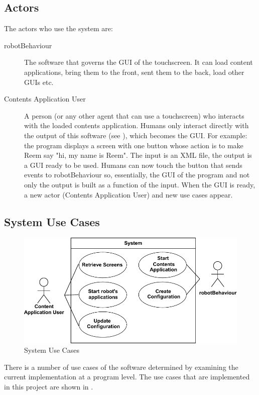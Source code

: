 \subsection*{Actors}
The actors who use the system are:
\begin{description}
	\item[robotBehaviour] The software that governs the \ac{GUI} of the touchscreen. It can load content applications, bring them to the front, sent them to the back, load other \acp{GUI} etc.
	\item[Contents Application User] A person (or any other agent that can use a touchscreen) who interacts with the loaded contents application. Humans only interact directly with the output of this software (see ), which becomes the \ac{GUI}.
For example: the program displays a screen with one button whose action is to make Reem say "hi, my name is Reem".
The input is an \ac{XML} file, the output is a \ac{GUI} ready to be used.
Humans can now touch the button that sends events to robotBehaviour so, essentially, the \ac{GUI} of the program and not only the output is built as a function of the input.
When the \ac{GUI} is ready, a new actor (Contents Application User) and new use cases appear.
\end{description}

\subsection*{System Use Cases}
\begin{figure}[htb]  
    \centering
    \includegraphics[width=\linewidth]{figures/specification-sucs}
    \caption{System Use Cases}
    \label{fig:specification-sucs}
\end{figure}

There is a number of use cases of the software determined by examining the current implementation at a program level.
The use cases that are implemented in this project are shown in .

